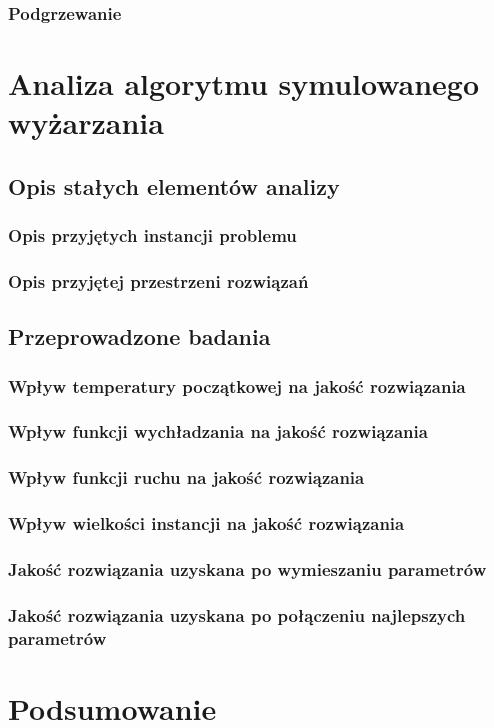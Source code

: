 \subsection{Podgrzewanie}


\chapter{Analiza algorytmu symulowanego wyżarzania}
\section{Opis stałych elementów analizy}
\subsection{Opis przyjętych instancji problemu}
\subsection{Opis przyjętej przestrzeni rozwiązań}
\section{Przeprowadzone badania}
\subsection{Wpływ temperatury początkowej na jakość rozwiązania}
\subsection{Wpływ funkcji wychładzania na jakość rozwiązania}
\subsection{Wpływ funkcji ruchu na jakość rozwiązania}
\subsection{Wpływ wielkości instancji na jakość rozwiązania}
\subsection{Jakość rozwiązania uzyskana po wymieszaniu parametrów}
\subsection{Jakość rozwiązania uzyskana po połączeniu najlepszych parametrów}

\chapter{Podsumowanie}
